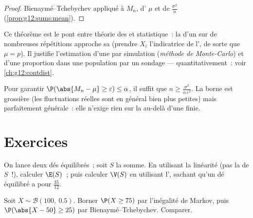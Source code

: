 \begin{proof}
Bienaymé--Tchebychev appliqué à $M_n$, d' $\mu$ et de 
$\frac{\sigma^2}{n}$ (\cref{prop:g12:sums:mean}).
\end{proof}

\begin{remark}
Ce théorème est le pont entre théorie des  et statistique~: la
\emph{} d'un  sur de nombreuses répétitions 
approche sa \emph{} (prendre $X_i$ l'indicatrice de l',
de sorte que $\mu = p$). Il justifie l'estimation d'une  par
simulation (\emph{méthode de Monte-Carlo}) et d'une proportion dans une
population par un sondage --- quantitativement~: voir
\cref{ch:g12:contdist}.
\end{remark}

\begin{method}\label{met:g12:sums:chebyshev}
Pour garantir $\P(\abs{M_n - \mu} \geq \varepsilon) \leq \alpha$, il
suffit que $n \geq \frac{\sigma^2}{\alpha\,\varepsilon^2}$. La borne est
grossière (les fluctuations réelles sont en général bien plus petites) mais
parfaitement générale~: elle n'exige rien sur la  au-delà d'une 
finie.
\end{method}

\section{Exercices}

\begin{exercise}[$\star$]\label{exo:g12:sums:1}
On lance deux dés équilibrés~; soit $S$ la somme. En utilisant la linéarité
(pas la  de $S$~!), calculer $\E(S)$~; puis calculer $\V(S)$ en
utilisant l', sachant qu'un dé équilibré a pour 
$\frac{35}{12}$.
\end{exercise}

\begin{exercise}[$\star$]\label{exo:g12:sums:2}
Soit $X \sim \mathcal B(100,\ 0.5)$. Borner
$\P(X \geq 75)$ par l'inégalité de Markov, puis
$\P(\abs{X - 50} \geq 25)$ par Bienaymé--Tchebychev. Comparer.
\end{exercise}

